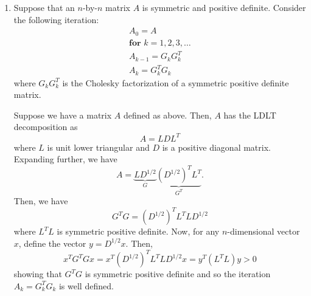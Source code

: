 \documentclass[a4paper,12pt]{article}
\begin{document}
\begin{enumerate}[label = (\arabic*)]
	\item Suppose that an $ n $-by-$ n $ matrix $ A $ is symmetric and positive definite. Consider the following iteration:
	\begin{gather*}
		A_0 = A \\
		\textbf{for } k = 1,2,3,\ldots \\
		A_{k - 1} = G_k G_k^T\\
		A_k = G_k^T G_k
	\end{gather*}
	where $ G_k G_k^T $ is the Cholesky factorization of a symmetric positive definite matrix.
	
	Suppose we have a matrix $ A $ defined as above. Then, $ A $ has the LDLT decomposition as
	\[
		A = LDL^T
	\]
	where $ L $ is unit lower triangular and $ D $ is a positive diagonal matrix. Expanding further, we have
	\[
		A = \underbrace{L D^{1/2}}_G \underbrace{(D^{1/2})^T L^T}_{G^T}.
	\]
	Then, we have
	\[
		G^T G = (D^{1/2})^T L^T L D^{1/2}
	\]
	where $ L^T L $ is symmetric positive definite. Now, for any $ n $-dimensional vector $ x $, define the vector $ y = D^{1/2} x $. Then,
	\[
		x^T G^T G x = x^T (D^{1/2})^T L^T L D^{1/2} x = y^T (L^T L) y > 0
	\]
	showing that $ G^T G $ is symmetric positive definite and so the iteration $ A_k = G^T_k G_k $ is well defined.
	

\end{enumerate}
\end{document}
